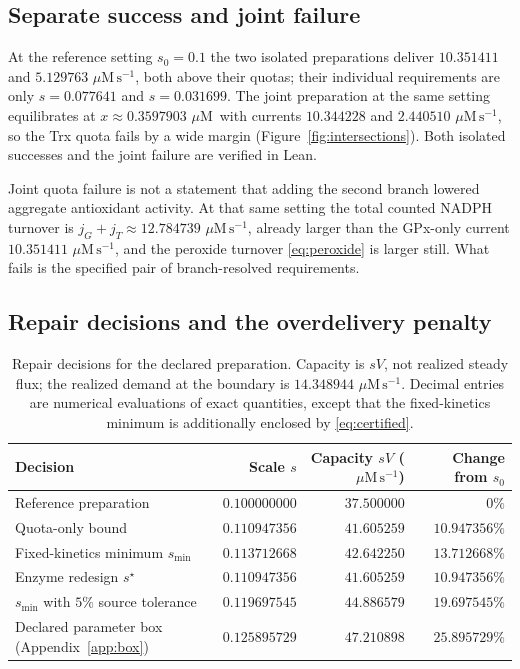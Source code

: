 \documentclass[11pt,a4paper]{article}
\theoremstyle{plain}
\theoremstyle{definition}
\theoremstyle{remark}
\newcommand{\uM}{\ensuremath{\mu\mathrm{M}}}
\newcommand{\fluxunit}{\ensuremath{\mu\mathrm{M}\,\mathrm{s}^{-1}}}
\begin{document}
\subsection{Separate success and joint failure}

At the reference setting $s_0=0.1$ the two isolated preparations deliver
$10.351411$ and $5.129763$ \fluxunit, both above their quotas; their individual
requirements are only $s=0.077641$ and $s=0.031699$. The joint preparation at the
same setting equilibrates at $x\approx0.3597903$ \uM\ with currents
$10.344228$ and $2.440510$ \fluxunit, so the Trx quota fails by a wide margin
(Figure~\ref{fig:intersections}). Both isolated successes and the joint failure
are verified in Lean.

Joint quota failure is not a statement that adding the second branch lowered
aggregate antioxidant activity. At that same setting the total counted NADPH
turnover is $j_G+j_T\approx12.784739$ \fluxunit, already larger than the GPx-only
current $10.351411$ \fluxunit, and the peroxide turnover \eqref{eq:peroxide} is
larger still. What fails is the specified pair of branch-resolved requirements.

\subsection{Repair decisions and the overdelivery penalty}

\begin{table}[tb]
\centering\small
\caption{Repair decisions for the declared preparation. Capacity is $sV$, not
realized steady flux; the realized demand at the boundary is
$14.348944$ \fluxunit. Decimal entries are numerical evaluations of exact
quantities, except that the fixed-kinetics minimum is additionally enclosed by
\eqref{eq:certified}.}
\label{tab:repairs}
\begin{tabular}{lrrr}
\toprule
Decision & Scale $s$ & Capacity $sV$ (\fluxunit) & Change from $s_0$\\
\midrule
Reference preparation & $0.100000000$ & $37.500000$ & $0\%$\\
Quota-only bound & $0.110947356$ & $41.605259$ & $10.947356\%$\\
Fixed-kinetics minimum $s_{\min}$ & $0.113712668$ & $42.642250$ & $13.712668\%$\\
Enzyme redesign $s^\star$ & $0.110947356$ & $41.605259$ & $10.947356\%$\\
$s_{\min}$ with $5\%$ source tolerance & $0.119697545$ & $44.886579$ & $19.697545\%$\\
Declared parameter box (Appendix~\ref{app:box}) & $0.125895729$ & $47.210898$ & $25.895729\%$\\
\bottomrule
\end{tabular}
\end{table}
\end{document}
